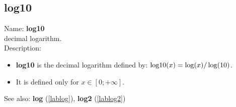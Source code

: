 \subsection{log10}
\label{lablog10}
\noindent Name: \textbf{log10}\\
decimal logarithm.\\
\noindent Description: \begin{itemize}

\item \textbf{log10} is the decimal logarithm defined by: ${\rm log10}(x) = \log(x)/\log(10)$.

\item It is defined only for $x \in [0; +\infty]$.
\end{itemize}
See also: \textbf{log} (\ref{lablog}), \textbf{log2} (\ref{lablog2})
